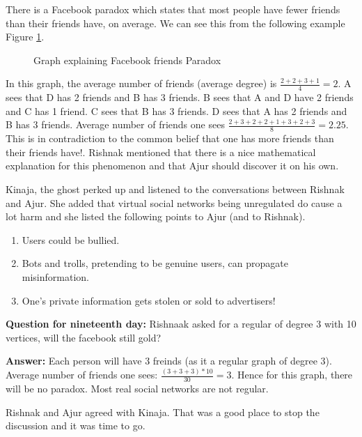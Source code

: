  There is a Facebook paradox which states that most people have fewer friends than their friends have, on average. We can see this from the following example Figure \ref{21g1}.
 \begin{figure}
\begin{center}
\caption{ Graph explaining Facebook friends Paradox}\label{21g1}
\end{center}
\end{figure}

In this graph, the average number of friends (average degree) is $\frac{2+2+3+1}{4}=2$.  A sees that D has 2 friends and B has 3 friends. B sees that A and D have 2 friends and C has 1 friend. C sees that B has 3 friends. D sees that A has 2 friends and B has 3 friends. Average number of friends one sees 
$\frac{2+3+2+2+1+3+2+3}{8}=2.25$. This is in contradiction to the common belief that one has more friends than their friends have!. Rishnak mentioned that there is a nice mathematical explanation for this phenomenon and that Ajur should discover it on his own.

Kinaja, the ghost perked up and listened to the conversations between Rishnak and Ajur. She added that virtual social networks being unregulated do cause a lot harm and she listed the following points to Ajur (and to Rishnak).
\begin{enumerate}
    \item Users could be bullied.
    \item  Bots and trolls, pretending to be genuine users,  can propagate misinformation.
    \item  One's private information gets stolen or sold to advertisers!
\end{enumerate}


\textbf{Question for nineteenth day:} Rishnaak asked for a regular of degree 3 with 10 vertices, will the facebook still gold?

\textbf{Answer:} Each person will have 3 freinds (as it a regular graph of degree 3).  Average number of friends one sees: $\frac{(3+3+3)*10}{30}=3$. Hence for this graph, there will be no paradox. Most real social networks are not regular.

Rishnak and Ajur agreed with Kinaja. That was a good place to stop the discussion and it was time to go.
